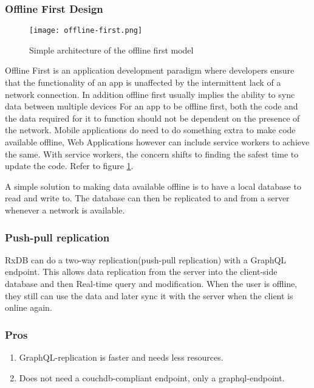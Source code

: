 \subsubsection{Offline First Design}

\begin{figure}[h!]
    \begin{center}
        \texttt{[image: offline-first.png]}
    \end{center}
    \caption{Simple architecture of the offline first model}
    \label{fig:offline-first}
\end{figure}

Offline First is an application development paradigm where developers ensure that the functionality of an app is unaffected by the intermittent lack of a network connection. 
In addition offline first usually implies the ability to sync data between multiple devices
For an app to be offline first, both the code and the data required for it to function should not be dependent on the presence of the network.
Mobile applications do need to do something extra to make code available offline,
Web Applications however can include service workers to achieve the same.
With service workers, the concern shifts to finding the safest time to update the code. 
Refer to figure \ref{fig:offline-first}.

A simple solution to making data available offline is to have a local database to read and write to. The database can then be replicated to and from a 
server whenever a network is available.~\cite{HasuraOfflineFirst}


\subsubsection{Push-pull replication}

RxDB can do a two-way replication(push-pull replication) with a GraphQL endpoint. 
This allows data replication from the server into the client-side database and then 
Real-time query and modification.
When the user is offline, they still can use the data and later sync it with the server 
when the client is online again.

\subsubsection*{Pros}
\begin{enumerate}
    \item GraphQL-replication is faster and needs less resources.
    \item Does not need a couchdb-compliant endpoint, only a graphql-endpoint.
\end{enumerate}


